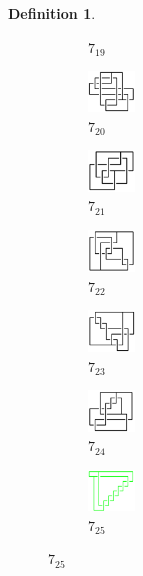 \documentclass{article}
\theoremstyle{definition}
\newtheorem{defn}[thm]{Definition}
\theoremstyle{theorem}
\theoremstyle{proposition}
\theoremstyle{corollary}
\begin{document}
\begin{defn}
\begin{figure}[H]
\begin{subfigure}{0.075\textwidth}
    \caption{$7_{19}$} 
    \end{subfigure}
    \begin{subfigure}{0.075\textwidth}
    \includegraphics[width=1.25cm]{../Midterm_Poster/grid_diagram/theta_7_20.png}
    \caption{$7_{20}$} 
    \end{subfigure}
    \begin{subfigure}{0.075\textwidth}
    \includegraphics[width=1.25cm]{../Midterm_Poster/grid_diagram/theta_7_21.png}
    \caption{$7_{21}$} 
    \end{subfigure}
    \begin{subfigure}{0.075\textwidth}
    \includegraphics[width=1.25cm]{../Midterm_Poster/grid_diagram/theta_7_22.png}
    \caption{$7_{22}$} 
    \end{subfigure}
    \begin{subfigure}{0.075\textwidth}
    \includegraphics[width=1.25cm]{../Midterm_Poster/grid_diagram/theta_7_23.png}
    \caption{$7_{23}$} 
    \end{subfigure}
    \begin{subfigure}{0.075\textwidth}
    \includegraphics[width=1.25cm]{../Midterm_Poster/grid_diagram/theta_7_24.png}
    \caption{$7_{24}$} 
    \end{subfigure}
    \begin{subfigure}{0.075\textwidth}
    \includegraphics[width=1.25cm]{../Midterm_Poster/grid_diagram/theta_7_25.png}
    \caption{$7_{25}$} 
    \end{subfigure}

\end{figure}
\end{defn}
\end{document}

